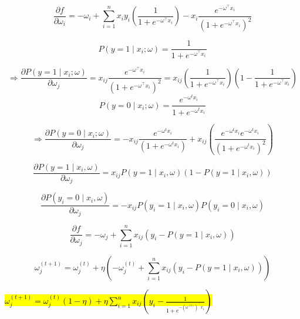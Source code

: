 \begin{qsolve}
\begin{qsolve}[]
		\[
		\frac{\partial f}{\partial \omega_i} = -\omega_i + \sum_{i=1}^n x_i y_i \left(\frac{1}{1+e^{-\omega^\top x_i}}\right) - x_i \frac{e^{-\omega^\top x_i}}{(1+e^{-\omega^\top x_i})^2}
		\]
		
		\[
		P(y=1 \mid x_i; \omega) = \frac{1}{1+e^{-\omega^\top x_i}}
		\]

		\[
		\Rightarrow \frac{\partial P(y=1 \mid x_i;\omega)}{\partial \omega_j} = x_{ij} \frac{e^{-\omega^\top x_i}}{(1+e^{-\omega^\top x_i})^2} = x_{ij} \left(\frac{1}{1+e^{-\omega^\top x_i}}\right) \left(1 - \frac{1}{1+e^{-\omega^\top x_i}}\right)
		\]
		\splitqsolve[\splitqsolve]
		\[
		P(y=0 \mid x_i; \omega) = 	\frac{e^{-\omega^t x_i}}{1+e^{-\omega^t x_i}}
		\]

		\[
			\Rightarrow \frac{\partial P(y=0 \mid x_i;\omega)}{\partial \omega_j} = -x_{ij} \frac{e^{-\omega^t x_i}}{(1+e^{-\omega^t x_i})} + x_{ij} \left(\frac{e^{-\omega^t x_i}e^{-\omega^t x_i}}{(1+e^{-\omega^t x_i})^2}\right)
		\]
		
		\[
		\frac{\partial P(y=1 \mid x_i, \omega)}{\partial \omega_j} = x_{ij} P(y=1 \mid x_i, \omega) (1 - P(y=1 \mid x_i, \omega))
		\]

		\[
		\frac{\partial P(y_i = 0 \mid x_i, \omega)}{\partial \omega_j} = - x_{ij} P(y_i = 1 \mid x_i, \omega) P(y_i = 0 \mid x_i, \omega)
		\]

		\[
		\frac{\partial f}{\partial \omega_j} = -\omega_j + \sum_{i=1}^n x_{ij} (y_i - P(y=1 \mid x_i, \omega))
		\]

		\[
		\omega_j^{(t+1)} = \omega_j^{(t)} + \eta \left(-\omega_j^{(t)} + \sum_{i=1}^n x_{ij} (y_i - P(y=1 \mid x_i, \omega))\right)
		\]
		\begin{center}
			\hl{$\omega_j^{(t+1)} = \omega_j^{(t)} (1-\eta) + \eta \sum_{i=1}^n x_{ij} \left(y_i - \frac{1}{1+e^{-(\omega^{(t)})^\top x_i}}\right)$}		
		\end{center}
		
		\end{qsolve}
\end{qsolve}